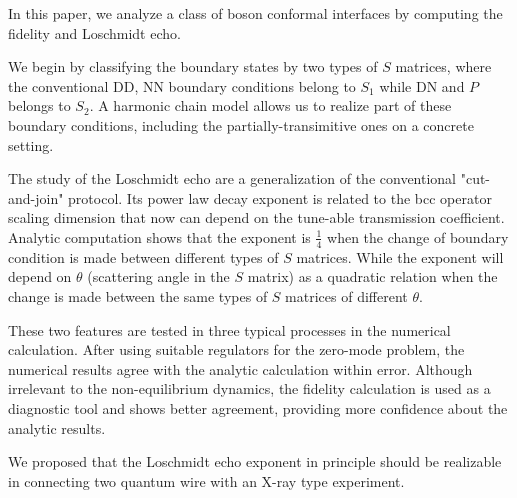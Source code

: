 
In this paper, we analyze a class of boson conformal interfaces by computing the fidelity and Loschmidt echo. 

We begin by classifying the boundary states by two types of $S$ matrices, where the conventional DD, NN boundary conditions belong to $S_1$ while DN and $P$ belongs to $S_2$. A harmonic chain model allows us to realize part of these boundary conditions, including the partially-transimitive ones on a concrete setting. 

The study of the Loschmidt echo are a generalization of the conventional "cut-and-join" protocol. Its power law decay exponent is related to the bcc operator scaling dimension that now can depend on the tune-able transmission coefficient. Analytic computation shows that the exponent is $\frac{1}{4}$ when the change of boundary condition is made between different types of $S$ matrices. While the exponent will depend on $\theta$ (scattering angle in the $S$ matrix) as a quadratic relation when the change is made between the same types of $S$ matrices of different $\theta$.

These two features are tested in three typical processes in the numerical calculation. After using suitable regulators for the zero-mode problem, the numerical results agree with the analytic calculation within error. Although irrelevant to the non-equilibrium dynamics, the fidelity calculation is used as a diagnostic tool and shows better agreement, providing more confidence about the analytic results. 

We proposed that the Loschmidt echo exponent in principle should be realizable in connecting two quantum wire with an X-ray type experiment. 




